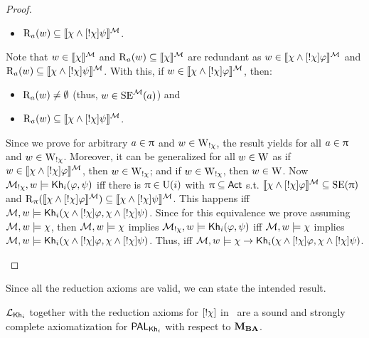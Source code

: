 \begin{proof}
\begin{itemize}
\begin{itemize}
		\item $\operatorname{R}_a(w) \subseteq \llbracket \chi \wedge [!\chi]\psi \rrbracket^{\mathcal{M}}$.
	\end{itemize}
	Note that $w \in \llbracket \chi \rrbracket^{\mathcal{M}}$ and $\operatorname{R}_a(w) \subseteq \llbracket \chi \rrbracket^{\mathcal{M}}$ are redundant as $w \in \llbracket \chi \wedge [!\chi]\varphi \rrbracket^{\mathcal{M}}$ and $\operatorname{R}_a(w) \subseteq \llbracket \chi \wedge [!\chi]\psi \rrbracket^{\mathcal{M}}$.
	With this, if $w \in \llbracket \chi \wedge [!\chi]\varphi \rrbracket^{\mathcal{M}}$, then:
	\begin{itemize}
		\item $\operatorname{R}_a(w) \neq \emptyset$ (thus, $w \in \operatorname{SE}^{\mathcal{M}}(a)$) and
		\item $\operatorname{R}_a(w) \subseteq \llbracket \chi \wedge [!\chi]\psi \rrbracket^{\mathcal{M}}$.
	\end{itemize}
	Since we prove for arbitrary $a \in \uppi$ and $w \in \operatorname{W}_{!\chi}$, the result yields for all $a \in \uppi$ and $w \in \operatorname{W}_{!\chi}$.
	Moreover, it can be generalized for all $w \in \operatorname{W}$ as if $w \in \llbracket \chi \wedge [!\chi]\varphi \rrbracket^{\mathcal{M}}$, then $w \in \operatorname{W}_{!\chi}$; and if $w \in \operatorname{W}_{!\chi}$, then $w \in \operatorname{W}$.
	Now $\mathcal{M}_{!\chi},w \models {\sf Kh}_i(\varphi,\psi)$ iff there is $\uppi \in \operatorname{U}(i)$ with $\uppi \subseteq {\rm \sf Act}$ s.t. $\llbracket \chi \wedge [!\chi]\varphi \rrbracket^{\mathcal{M}} \subseteq \operatorname{SE}(\uppi)$ and $\operatorname{R}_\uppi(\llbracket \chi \wedge [!\chi]\varphi \rrbracket^{\mathcal{M}}) \subseteq \llbracket \chi \wedge [!\chi]\psi \rrbracket^{\mathcal{M}}$.
	This happens iff $\mathcal{M},w \models {\sf Kh}_i(\chi \wedge [!\chi]\varphi,\chi \wedge [!\chi]\psi)$. Since for this equivalence we prove assuming $\mathcal{M},w \models \chi$, then $\mathcal{M},w \models \chi$ implies $\mathcal{M}_{!\chi},w \models {\sf Kh}_i(\varphi,\psi)$ iff $\mathcal{M},w \models \chi$ implies $\mathcal{M},w \models {\sf Kh}_i(\chi \wedge [!\chi]\varphi,\chi \wedge [!\chi]\psi)$. Thus, iff $\mathcal{M},w \models \chi \rightarrow {\sf Kh}_i(\chi \wedge [!\chi]\varphi,\chi \wedge [!\chi]\psi)$.
	\end{itemize}
	\end{proof}
	
	

Since all the reduction axioms are valid, we can state the intended result. 

\medskip 

\begin{theorem}\label{th:palcomplete}
$\mathcal{L}_{{\sf Kh}_i}$ together with the reduction axioms for $[!\chi]$ in~ are a sound and strongly complete axiomatization for $\mathsf{PAL}_{{\sf Kh}_i}$ with respect to $\mathbf{M}_{\mathbf{BA}}$.
\end{theorem}

